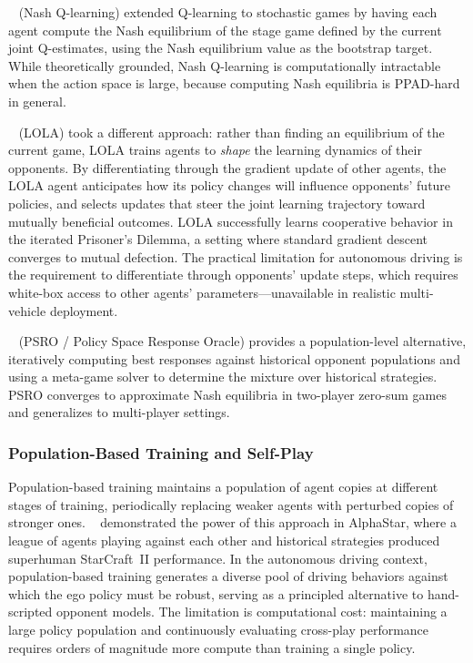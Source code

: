 \documentclass[12pt, a4paper]{article}
\begin{document}
\citeauthor{hu2003nash}~\cite{hu2003nash} (Nash Q-learning) extended Q-learning
to stochastic games by having each agent compute the Nash equilibrium of the
stage game defined by the current joint Q-estimates, using the Nash equilibrium
value as the bootstrap target.  While theoretically grounded, Nash Q-learning
is computationally intractable when the action space is large, because
computing Nash equilibria is PPAD-hard in general.

\citeauthor{foerster2018lola}~\cite{foerster2018lola} (LOLA) took a different
approach: rather than finding an equilibrium of the current game, LOLA trains
agents to \emph{shape} the learning dynamics of their opponents.  By
differentiating through the gradient update of other agents, the LOLA agent
anticipates how its policy changes will influence opponents' future policies,
and selects updates that steer the joint learning trajectory toward mutually
beneficial outcomes.  LOLA successfully learns cooperative behavior in the
iterated Prisoner's Dilemma, a setting where standard gradient descent converges
to mutual defection.  The practical limitation for autonomous driving is the
requirement to differentiate through opponents' update steps, which requires
white-box access to other agents' parameters---unavailable in realistic
multi-vehicle deployment.

\citeauthor{lanctot2017unified}~\cite{lanctot2017unified} (PSRO / Policy Space
Response Oracle) provides a population-level alternative, iteratively computing
best responses against historical opponent populations and using a meta-game
solver to determine the mixture over historical strategies.  PSRO converges
to approximate Nash equilibria in two-player zero-sum games and generalizes
to multi-player settings.

\subsubsection{Population-Based Training and Self-Play}

Population-based training maintains a population of agent copies at different
stages of training, periodically replacing weaker agents with perturbed copies
of stronger ones.  \citeauthor{vinyals2019alphastar}~\cite{vinyals2019alphastar}
demonstrated the power of this approach in AlphaStar, where a league of agents
playing against each other and historical strategies produced superhuman
StarCraft~II performance.  In the autonomous driving context, population-based
training generates a diverse pool of driving behaviors against which the ego
policy must be robust, serving as a principled alternative to hand-scripted
opponent models.  The limitation is computational cost: maintaining a large
policy population and continuously evaluating cross-play performance requires
orders of magnitude more compute than training a single policy.
\end{document}
